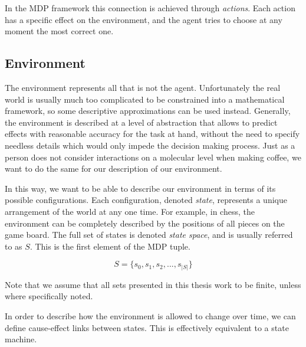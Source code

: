 
In the MDP framework this connection is achieved through \textit{actions}. Each action has a
specific effect on the environment, and the agent tries to choose at any moment the most correct
one.

\subsection{Environment}

The environment represents all that is not the agent. Unfortunately the real world is usually much
too complicated to be constrained into a mathematical framework, so some descriptive approximations
can be used instead. Generally, the environment is described at a level of abstraction that allows
to predict effects with reasonable accuracy for the task at hand, without the need to specify
needless details which would only impede the decision making process. Just as a person does not
consider interactions on a molecular level when making coffee, we want to do the same for our
description of our environment.

In this way, we want to be able to describe our environment in terms of its possible configurations.
Each configuration, denoted \textit{state}, represents a unique arrangement of the world at any one
time. For example, in chess, the environment can be completely described by the positions of all
pieces on the game board. The full set of states is denoted \textit{state space}, and is usually
referred to as $S$. This is the first element of the MDP tuple.

\[ S = \{s_0, s_1, s_2, ..., s_{|S|}\} \]

Note that we assume that all sets presented in this thesis work to be finite, unless where
specifically noted.

In order to describe how the environment is allowed to change over time, we can define
cause-effect links between states. This is effectively equivalent to a state machine.

